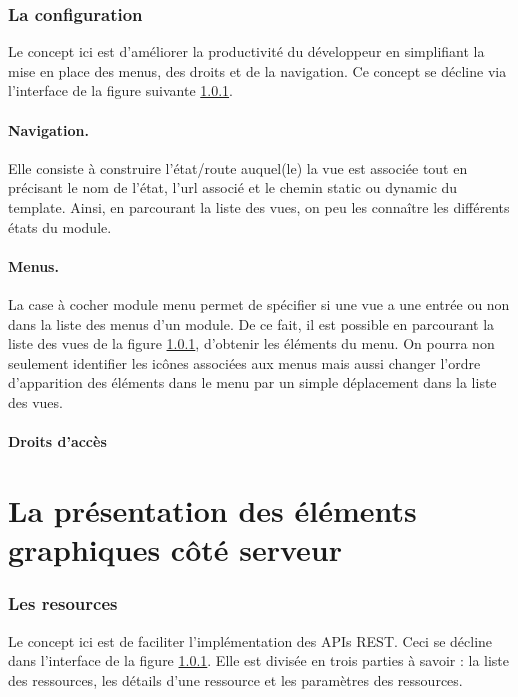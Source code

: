 \documentclass[a4paper,11pt]{report}
\begin{document}
 

\subsubsection{ La configuration} 
Le  concept ici est d'améliorer la productivité du développeur en
simplifiant la mise en place des menus, des droits et de la navigation.
Ce concept se décline via l'interface de la figure suivante \ref{}.

\paragraph{Navigation.}
Elle consiste à construire l'état/route auquel(le) la vue est associée
tout en précisant le nom de l'état, l'url associé et le chemin static
ou dynamic du template. Ainsi, en parcourant la liste des vues, on peu
les connaître les différents états du module.
 
\paragraph{Menus.}
La case à cocher \og module menu \fg permet de spécifier si une vue
a une entrée ou non dans la liste des menus d'un module.  De ce fait,
il est possible en parcourant la liste des vues de la figure \ref{},
d'obtenir les éléments du menu. On pourra non seulement identifier
les icônes associées aux menus mais aussi changer l'ordre d'apparition
des éléments dans le menu par un simple déplacement dans la liste des vues.
 
\paragraph{Droits d'accès}

\section{La présentation des éléments graphiques côté serveur}


\subsubsection{Les resources}
Le concept ici est de faciliter l'implémentation  des APIs
REST. Ceci se décline dans l'interface de la figure \ref{}.  Elle
est divisée en trois parties à savoir : la liste des ressources, les
détails d'une ressource et les paramètres des ressources.
\end{document}
